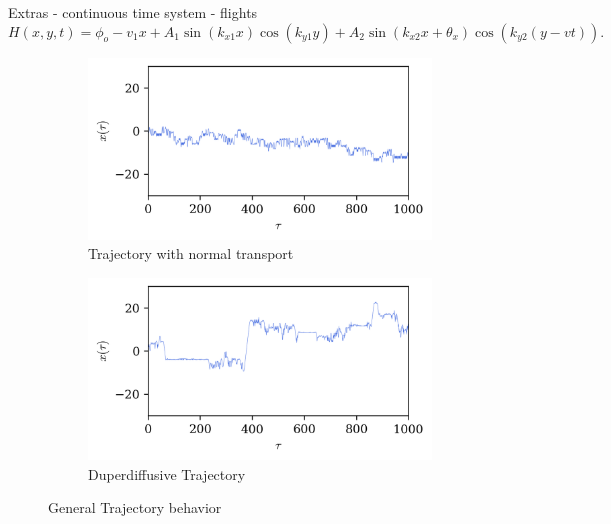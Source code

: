 \documentclass[10pt]{beamer}
\begin{document}
\begin{frame}{Extras - continuous time system - flights}
    \begin{equation}
        H(x,y,t) = \phi_o - v_1x + A_1 \sin(k_{x1}x)\cos(k_{y1}y) + {A_2}\sin(k_{x2}x + {\theta_x})\cos(k_{y2}(y - vt)).
      \end{equation}
    

    \begin{figure}
        \begin{subfigure}[b]{0.45\textwidth}
            \includegraphics[width = \textwidth]{graf_2ondas/traj_normal.png}
            \caption{Trajectory with normal transport}
        \end{subfigure}
        \begin{subfigure}[b]{0.45\textwidth}
            \includegraphics[width = \textwidth]{graf_2ondas/traj_anom.png}
            \caption{Duperdiffusive Trajectory}
        \end{subfigure}

        \caption{General Trajectory behavior}
    \end{figure}
\end{frame}
\end{document}
